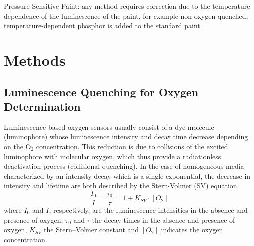 \documentclass[9pt,twocolumn,twoside,pdftex]{optica}
\begin{document}
Pressure Sensitive Paint: any method requires correction due to the temperature dependence of the luminescence of the paint, for example non-oxygen quenched,  temperature-dependent  phosphor  is  added  to  the  standard  paint

\section{Methods}
\label{sec:methods}

\subsection{Luminescence Quenching for Oxygen Determination}
\label{Theory}

Luminescence-based oxygen sensors usually consist of a dye molecule (luminophore) whose luminescence intensity and decay time decrease depending on the O$_2$ concentration. This reduction is due to collisions of the excited luminophore with molecular oxygen, which thus provide a radiationless deactivation process (collisional quenching). 
In the case of homogeneous media characterized by an intensity decay which is a single exponential, the decrease in intensity and lifetime are both described by the Stern-Volmer (SV) equation \cite{Lakowicz2006}
\begin{equation}
\frac{I_0}{I}=\frac{\tau_0}{\tau}=1+K_{SV} \cdot \left[O_2\right]
\label{SVe}
\end{equation}
where $I_0$ and $I$, respectively, are the luminescence intensities in the absence and presence of oxygen, $\tau_0$ and $\tau$ the decay times in the absence and presence of oxygen, $K_{SV}$ the Stern–Volmer constant and $\left[O_2\right]$ indicates the oxygen concentration.
\end{document}
